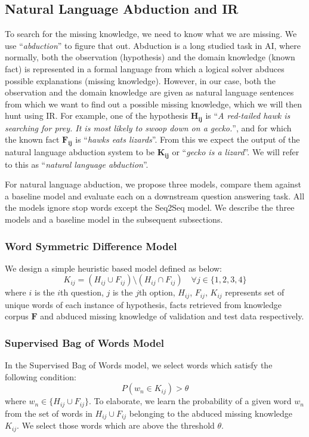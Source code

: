 \documentclass[11pt,a4paper]{article}
\begin{document}
\subsection{Natural Language Abduction and IR}
To search for the missing knowledge, we need to know what we are missing. We use ``\textit{abduction}'' to figure that out.
Abduction is a long studied task in AI, where normally, both the observation (hypothesis) and the domain knowledge (known fact) is represented in a formal language from which a logical solver abduces possible explanations (missing knowledge). However, in our case, both the observation and the domain knowledge are given as natural language sentences from which we want to find out a possible missing knowledge, which we will then hunt using IR. For example, one of the hypothesis $\mathbf{H_{ij}}$ is ``\textit{A red-tailed hawk is searching for prey. It is most likely to swoop down on a gecko.}'', and for which the known fact $\mathbf{F_{ij}}$ is ``\textit{hawks eats lizards}''. From this we expect the output of the natural language abduction system to be $\mathbf{K_{ij}}$ or ``\textit{gecko is a lizard}''. We will refer to this as ``\textit{natural language abduction}''. 




For natural language abduction, we propose three models, compare them against a baseline model and evaluate each on a downstream question answering task. All the models ignore stop words except the Seq2Seq model. We describe the three models and a baseline model in the subsequent subsections.


\subsubsection{Word Symmetric Difference Model}
We design a simple heuristic based model defined as below:
\begin{equation*}
    K_{ij} = (H_{ij} \cup F_{ij}) \setminus (H_{ij} \cap F_{ij}) \quad \forall j \in \{1,2,3,4\}  
\end{equation*}
where $i$ is the $i$th question, $j$ is the $j$th option, $H_{ij}$, $F_{ij}$, $K_{ij}$ represents set of unique words of each instance of hypothesis, facts retrieved from knowledge corpus $\mathbf{F}$ and abduced missing knowledge of validation and test data respectively.
\subsubsection{Supervised Bag of Words Model}
In the Supervised Bag of Words model, we select words which satisfy the following condition: 
\begin{equation*}
    P(w_n \in K_{ij}) > \theta 
\end{equation*}
where $w_n \in \{H_{ij} \cup F_{ij}\}$. To elaborate, we learn the probability of a given word $w_n$ from the set of words in $H_{ij} \cup F_{ij}$ belonging to the abduced missing knowledge $K_{ij}$. We select those words which are above the threshold $\theta$.
\end{document}
